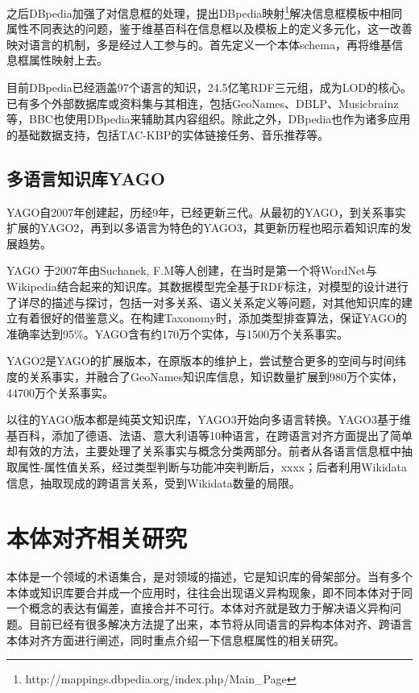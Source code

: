 之后DBpedia加强了对信息框的处理，提出DBpedia映射\footnote{http://mappings.dbpedia.org/index.php/Main_Page}解决信息框模板中相同属性不同表达的问题，鉴于维基百科在信息框以及模板上的定义多元化，这一改善映对语言的机制，多是经过人工参与的。首先定义一个本体schema，再将维基信息框属性映射上去\cite{mendes2012dbpedia}。

目前DBpedia已经涵盖97个语言的知识，24.5亿笔RDF三元组，成为LOD的核心。已有多个外部数据库或资料集与其相连，包括GeoNames、DBLP、Musicbrainz等，BBC也使用DBpedia来辅助其内容组织。除此之外，DBpedia也作为诸多应用的基础数据支持，包括TAC-KBP\cite{mendes2011evaluating}的实体链接任务、音乐推荐\cite{passant2010dbrec}等。 

\subsection{多语言知识库YAGO}
YAGO自2007年创建起，历经9年，已经更新三代。从最初的YAGO\cite{suchanek2007yago,suchanek2008yago}，到关系事实扩展的YAGO2\cite{hoffart2013yago2}，再到以多语言为特色的YAGO3\cite{mahdisoltani2014yago3}，其更新历程也昭示着知识库的发展趋势。

{\heiti YAGO} 于2007年由Suchanek, F.M等人创建，在当时是第一个将WordNet\cite{fellbaum1998wordnet}与Wikipedia结合起来的知识库。其数据模型完全基于RDF标注，对模型的设计进行了详尽的描述与探讨，包括一对多关系、语义关系定义等问题，对其他知识库的建立有着很好的借鉴意义。在构建Taxonomy时，添加类型排查算法，保证YAGO的准确率达到95\%。YAGO含有约170万个实体，与1500万个关系事实。

{\heiti YAGO2}是YAGO的扩展版本，在原版本的维护上，尝试整合更多的空间与时间纬度的关系事实，并融合了GeoNames知识库信息，知识数量扩展到980万个实体，44700万个关系事实。

以往的YAGO版本都是纯英文知识库，{\heiti YAGO3}开始向多语言转换。YAGO3基于维基百科，添加了德语、法语、意大利语等10种语言，在跨语言对齐方面提出了简单却有效的方法，主要处理了关系事实与概念分类两部分。前者从各语言信息框中抽取属性-属性值关系，经过类型判断与功能冲突判断后，xxxx；后者利用Wikidata信息，抽取现成的跨语言关系，受到Wikidata数量的局限。

\section{本体对齐相关研究}

本体是一个领域的术语集合，是对领域的描述，它是知识库的骨架部分。当有多个本体或知识库要合并成一个应用时，往往会出现{\heiti 语义异构}现象，即不同本体对于同一个概念的表达有偏差，直接合并不可行。本体对齐就是致力于解决语义异构问题。目前已经有很多解决方法提了出来，本节将从同语言的异构本体对齐、跨语言本体对齐方面进行阐述，同时重点介绍一下信息框属性的相关研究。

